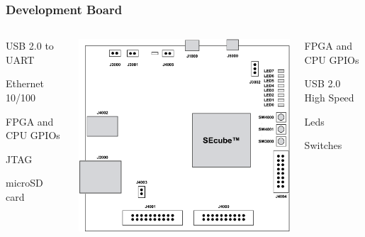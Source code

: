 \documentclass[14pt,usenames,dvipsnames]{beamer}
\begin{document}
\begin{frame}
	\frametitle{Development Board}
	
	\begin{columns}
			\begin{description}
				\setlength\itemsep{-3pt}
				\fontsize{11pt}{14}\selectfont
				\item  [J1000] USB 2.0 to UART 
				\item [J2000]  Ethernet 10/100 
				\item [J4000]  FPGA and CPU GPIOs
				\item [J4001]  JTAG
				\item [J4002]  microSD card 
			\end{description}    
    
      \includegraphics[width=\columnwidth]{devboard_sch}
			\begin{description}
			\fontsize{11pt}{14}\selectfont
				\setlength\itemsep{-3pt}
				\item [J4004]  FPGA and CPU GPIOs
				\item [J5000]  USB 2.0 High Speed 
				\item [LEDx]   Leds 
				\item [SWx00y]  Switches 
			\end{description}       
    

\end{columns}
\end{frame}
\end{document}

